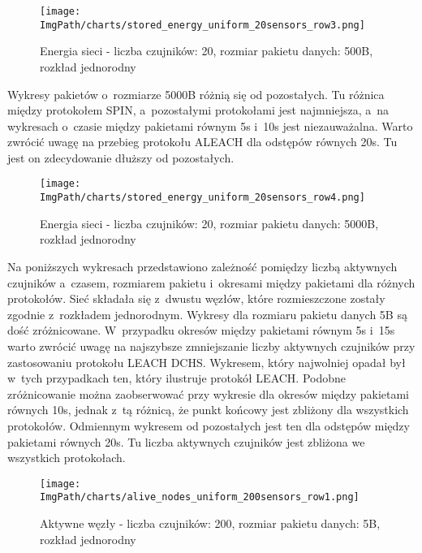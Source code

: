 \begin{figure}[H]
	\begin{center}
		\texttt{[image: \\ImgPath/charts/stored\_energy\_uniform\_20sensors\_row3.png]}
	\end{center}
	\caption{Energia sieci - liczba czujników: 20, rozmiar pakietu danych: 500B, rozkład jednorodny}
\end{figure}
 
Wykresy pakietów o~rozmiarze 5000B różnią się od pozostałych. Tu różnica między protokołem SPIN, a~pozostałymi protokołami jest najmniejsza, a~na wykresach o~czasie między pakietami równym 5s i~10s jest niezauważalna. Warto zwrócić uwagę na przebieg protokołu ALEACH dla odstępów równych 20s. Tu jest on zdecydowanie dłuższy od pozostałych. 

\begin{figure}[H]
	\begin{center}
		\texttt{[image: \\ImgPath/charts/stored\_energy\_uniform\_20sensors\_row4.png]}
	\end{center}
	\caption{Energia sieci - liczba czujników: 20, rozmiar pakietu danych: 5000B, rozkład jednorodny}
\end{figure}

Na poniższych wykresach przedstawiono zależność pomiędzy liczbą aktywnych czujników a~czasem, rozmiarem pakietu i~okresami między pakietami dla różnych protokołów. Sieć składała się z~dwustu węzłów, które rozmieszczone zostały zgodnie z~rozkładem jednorodnym.
Wykresy dla rozmiaru pakietu danych 5B są dość zróżnicowane. W~przypadku okresów między pakietami równym 5s i~15s warto zwrócić uwagę na najszybsze zmniejszanie liczby aktywnych czujników przy zastosowaniu protokołu LEACH DCHS. Wykresem, który najwolniej opadał był w~tych przypadkach ten, który ilustruje protokół LEACH. Podobne zróżnicowanie można zaobserwować przy wykresie dla okresów między pakietami równych 10s, jednak z~tą różnicą, że punkt końcowy jest zbliżony dla wszystkich protokołów. Odmiennym wykresem od pozostałych jest ten dla odstępów między pakietami równych 20s. Tu liczba aktywnych czujników jest zbliżona we wszystkich protokołach.

\begin{figure}[H]
	\begin{center}
		\texttt{[image: \\ImgPath/charts/alive\_nodes\_uniform\_200sensors\_row1.png]}
	\end{center}
	\caption{Aktywne węzły - liczba czujników: 200, rozmiar pakietu danych: 5B, rozkład jednorodny}
\end{figure}

